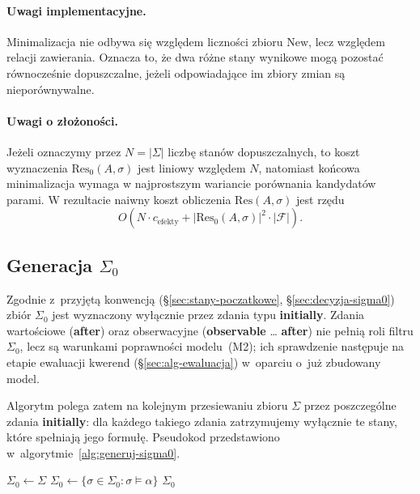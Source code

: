 \documentclass[11pt,a4paper]{article}
\newcommand{\aft}{\textbf{after}}
\newcommand{\initially}{\textbf{initially}}
\newcommand{\observable}{\textbf{observable}}
\theoremstyle{definition}
\begin{document}
\paragraph{Uwagi implementacyjne.}
Minimalizacja nie odbywa się względem liczności zbioru $\mathrm{New}$, lecz względem relacji zawierania. Oznacza to, że dwa różne stany wynikowe mogą pozostać równocześnie dopuszczalne, jeżeli odpowiadające im zbiory zmian są nieporównywalne.

\paragraph{Uwagi o złożoności.}
Jeżeli oznaczymy przez $N = |\Sigma|$ liczbę stanów dopuszczalnych, to koszt wyznaczenia $\mathrm{Res}_0(A,\sigma)$ jest liniowy względem $N$, natomiast końcowa minimalizacja wymaga w najprostszym wariancie porównania kandydatów parami. W rezultacie naiwny koszt obliczenia $\mathrm{Res}(A,\sigma)$ jest rzędu
\[
O(N \cdot c_{\text{efekty}} + |\mathrm{Res}_0(A,\sigma)|^2 \cdot |\mathcal{F}|).
\]

\subsection{Generacja \texorpdfstring{$\Sigma_0$}{Sigma0}}
\label{sec:alg-sigma0}

Zgodnie z~przyjętą konwencją (§\ref{sec:stany-poczatkowe}, §\ref{sec:decyzja-sigma0}) zbiór $\Sigma_0$ jest wyznaczony wyłącznie przez zdania typu \initially{}. Zdania wartościowe (\aft{}) oraz obserwacyjne (\observable{} \ldots{} \aft{}) nie pełnią roli filtru $\Sigma_0$, lecz są warunkami poprawności modelu~(M2); ich sprawdzenie następuje na etapie ewaluacji kwerend (§\ref{sec:alg-ewaluacja}) w~oparciu o~już zbudowany model.

Algorytm polega zatem na kolejnym przesiewaniu zbioru $\Sigma$ przez poszczególne zdania \initially{}: dla każdego takiego zdania zatrzymujemy wyłącznie te stany, które spełniają jego formułę. Pseudokod przedstawiono w~algorytmie~\ref{alg:generuj-sigma0}.

\begin{algorithm}[H]
\caption{Pseudokod dla algorytmu wyznaczającego stany początkowe}
\label{alg:generuj-sigma0}
\begin{algorithmic}[1]
        \State $\Sigma_0 \gets \Sigma$
            \State $\Sigma_0 \gets \{ \sigma \in \Sigma_0 : \sigma \models \alpha \}$
        \EndFor
        \State \Return $\Sigma_0$
    \EndProcedure
\end{algorithmic}
\end{algorithm}
\end{document}
